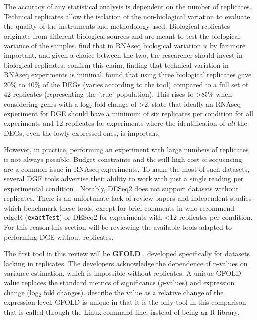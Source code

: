 The accuracy of any statistical analysis is dependent on the number of replicates. Technical replicates allow the isolation of the non-biological variation to evaluate the quality of the instruments and methodology used. Biological replicates originate from different biological sources and are meant to test the biological variance of the samples. \cite{liu2014rna} find that in RNAseq biological variation is by far more important, and given a choice between the two, the researcher should invest in biological replicates. \cite{bullard2010evaluation} confirm this claim, finding that technical variation in RNAseq experiments is minimal. \cite{schurch2016many} found that using three biological replicates gave 20\% to 40\% of the \ac{DEG}s (varies according to the tool) compared to a full set of 42 replicates (representing the 'true' population). This rises to >85\% when considering genes with a log$_2$ fold change of >2. \cite{schurch2016many} state that ideally an RNAseq experiment for \ac{DGE} should have a minimum of six replicates per condition for all experiments and 12 replicates for experiments where the identification of \textit{all} the \ac{DEG}s, even the lowly expressed ones, is important. 

However, in practice, performing an experiment with large numbers of replicates is not always possible. Budget constraints and the still-high cost of sequencing are a common issue in RNAseq experiments. To make the most of such datasets, several \ac{DGE} tools advertise their ability to work with just a single reading per experimental condition \citep{feng2012gfold, gim2016lpeseq, anders2010differential, wang2010degseq, al2014bootstrap}. Notably, DESeq2 does not support datasets without replicates. There is an unfortunate lack of review papers and independent studies which benchmark these tools, except for brief comments in \cite{schurch2016many} who recommend edgeR (\texttt{exactTest}) or DESeq2 for experiments with <12 replicates per condition. For this reason this section will be reviewing the available tools adapted to performing \ac{DGE} without replicates.

The first tool in this review will be \textbf{GFOLD} \citep{feng2012gfold}, developed specifically for datasets lacking in replicates. The developers acknowledge the dependence of p-values on variance estimation, which is impossible without replicates. A unique GFOLD value replaces the standard metrics of significance (\textit{p}-values) and expression change (log$_2$ fold changes). \cite{feng2012gfold} describe the value as a relative change of the expression level. GFOLD is unique in that it is the only tool in this comparison that is called through the Linux command line, instead of being an R library.

